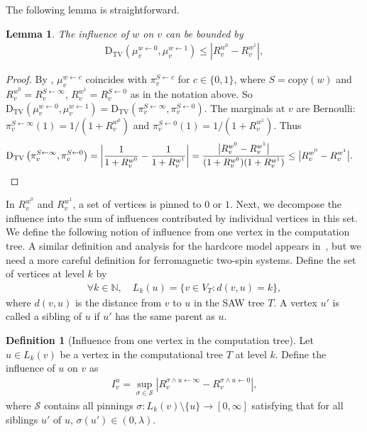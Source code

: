\documentclass[11pt]{amsart}
\def\+#1{\mathcal{#1}}
\def\-#1{\mathrm{#1}}
\newcommand{\abs}[1]{\ensuremath{\left\vert#1\right\vert}}
\newcommand{\DTV}[2]{\-D_{\mathrm{TV}}\left({#1},{#2}\right)}
\newtheorem{lemma}[theorem]{Lemma}
\theoremstyle{definition}
\newtheorem{definition}[theorem]{Definition}
\theoremstyle{remark}
\begin{document}
The following lemma is straightforward.
\begin{lemma}\label{lemma:dtv<R}
    The influence of $w$ on $v$ can be bounded by  
    \begin{align*}
        \DTV{\mu_v^{w \gets 0}}{\mu_v^{w \gets 1}} \leq \abs{R_v^{w^0}-R_v^{w^1}},
    \end{align*}
\end{lemma}
\begin{proof}
    By , $\mu_v^{w \gets c}$ coincides with $\pi_v^{S \gets c}$ for $c \in \{0,1\}$, where $S = \text{copy}(w)$ and $R_v^{w^0} = R_v^{S \gets \infty}$, $R_v^{w^1} = R_v^{S \gets 0}$ as in the notation above. So $\DTV{\mu_v^{w \gets 0}}{\mu_v^{w \gets 1}} = \DTV{\pi_v^{S \gets \infty}}{\pi_v^{S \gets 0}}$. The marginals at $v$ are Bernoulli: $\pi_v^{S \gets \infty}(1) = 1/(1+R_v^{w^0})$ and $\pi_v^{S \gets 0}(1) = 1/(1+R_v^{w^1})$. Thus
    \begin{align*}
    \DTV{\pi_v^{S \gets \infty}}{\pi_v^{S \gets 0}} = \left | \frac{1}{1+R_v^{w^0}} - \frac{1}{1+R_v^{w^1}} \right | = \frac{\bigl| R_v^{w^0} - R_v^{w^1} \bigr|}{(1+R_v^{w^0})(1+R_v^{w^1})} \leq \bigl| R_v^{w^0} - R_v^{w^1} \bigr|. &\qedhere
    \end{align*}
\end{proof}

In $R^{w^0}_v$ and $R^{w^1}_v$, a set of vertices is pinned to $0$ or $1$. Next, we decompose the influence into the sum of influences contributed by individual vertices in this set. We define the following notion of influence from one vertex in the computation tree. A similar definition and analysis for the hardcore model appears in~\cite{ALO24}, but we need a more careful definition for ferromagnetic two-spin systems. Define the set of vertices at level $k$ by
\begin{align*}
\forall k \in \mathbb{N}, \quad L_k(u) = \{v \in V_T: d(v,u) = k\},
\end{align*}
where $d(v,u)$ is the distance from $v$ to $u$ in the SAW tree $T$. A vertex $u'$ is called a sibling of $u$ if $u'$ has the same parent as $u$.

\begin{definition}[Influence from one vertex in the computation tree]\label{def:influence-from-one-vertex}
Let $u \in L_k(v)$ be a vertex in the computational tree $T$ at level $k$. Define the influence of $u$ on $v$ as
\begin{align*}
I_v^u = \sup_{\sigma \in \+S} \left | R_v^{\sigma \land u \gets \infty} - R_v^{\sigma \land u \gets 0} \right |,
\end{align*}
where $\+S$ contains all pinnings $\sigma: L_k(v) \setminus \{u\} \to [0,\infty]$ satisfying that for all siblings $u'$ of $u$, $\sigma(u') \in (0,\lambda)$.
\end{definition}
\end{document}
